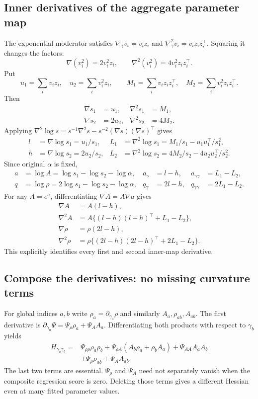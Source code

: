 \documentclass[11pt,a4paper]{article}
\numberwithin{equation}{section}
\begin{document}
\subsection{Inner derivatives of the aggregate parameter map}
The exponential moderator satisfies
$\nabla_\gamma v_i=v_iz_i$ and
$\nabla_\gamma^2v_i=v_iz_iz_i^\top$. Squaring it changes the factors:
\[
 \nabla(v_i^2)=2v_i^2z_i,\qquad
 \nabla^2(v_i^2)=4v_i^2z_iz_i^\top.
\]
Put
\[
 u_1=\sum_i v_i z_i,\quad u_2=\sum_i v_i^2 z_i,\qquad
 M_1=\sum_i v_i z_i z_i^\top,\quad
 M_2=\sum_i v_i^2 z_i z_i^\top.
\]
Then
\begin{align}
 \nabla s_1&=u_1,&\nabla^2s_1&=M_1,\\
 \nabla s_2&=2u_2,&\nabla^2s_2&=4M_2.
\end{align}
Applying $\nabla^2\log s=s^{-1}\nabla^2s
-s^{-2}(\nabla s)(\nabla s)^\top$ gives
\begin{align}
 l&=\nabla\log s_1=u_1/s_1,&
 L_1&=\nabla^2\log s_1=M_1/s_1-u_1u_1^\top/s_1^2,\\
 h&=\nabla\log s_2=2u_2/s_2,&
 L_2&=\nabla^2\log s_2=4M_2/s_2-4u_2u_2^\top/s_2^2.
\end{align}
Since original $\alpha$ is fixed,
\begin{align}
 a&=\log A=\log s_1-\log s_2-\log\alpha,&
 a_\gamma&=l-h,&a_{\gamma\gamma}&=L_1-L_2,\\
 q&=\log\rho=2\log s_1-\log s_2-\log\alpha,&
 q_\gamma&=2l-h,&q_{\gamma\gamma}&=2L_1-L_2.
 \label{eq:agg-log-inner}
\end{align}
For any $A=e^a$, differentiating $\nabla A=A\nabla a$ gives
\begin{align}
 \nabla A&=A(l-h),\\
 \nabla^2A&=A\{(l-h)(l-h)^\top+L_1-L_2\},\\
 \nabla\rho&=\rho(2l-h),\\
 \nabla^2\rho&=\rho\{(2l-h)(2l-h)^\top+2L_1-L_2\}.
 \label{eq:agg-inner}
\end{align}
This explicitly identifies every first and second inner-map derivative.

\subsection{Compose the derivatives: no missing curvature terms}
For global indices $a,b$ write
$\rho_a=\partial_{\gamma_a}\rho$ and similarly $A_a,\rho_{ab},A_{ab}$.
The first derivative is
$\partial_{\gamma_a}\Psi=\Psi_\rho\rho_a+\Psi_AA_a$.
Differentiating both products with respect to $\gamma_b$ yields
\begin{align}
 H_{\gamma_a\gamma_b}
 ={}&\Psi_{\rho\rho}\rho_a\rho_b
      +\Psi_{\rho A}(A_b\rho_a+\rho_bA_a)
      +\Psi_{AA}A_aA_b\\
 &+\Psi_\rho\rho_{ab}+\Psi_AA_{ab}.
 \label{eq:agg-global}
\end{align}
The last two terms are essential. $\Psi_\rho$ and $\Psi_A$ need not
separately vanish when the composite regression score is zero.
Deleting those terms gives a different Hessian even at many fitted
parameter values.
\end{document}
